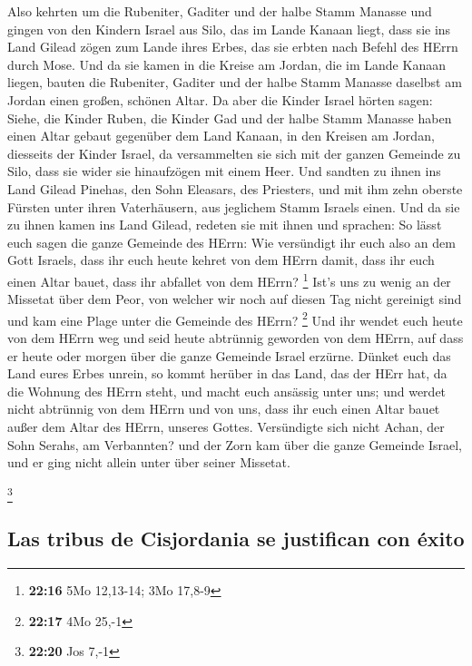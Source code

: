  Also kehrten um die Rubeniter, Gaditer und der halbe
Stamm Manasse und gingen von den Kindern Israel aus Silo, das im Lande
Kanaan liegt, dass sie ins Land Gilead zögen zum Lande ihres Erbes, das
sie erbten nach Befehl des HErrn durch Mose.  Und da sie
kamen in die Kreise am Jordan, die im Lande Kanaan liegen, bauten die
Rubeniter, Gaditer und der halbe Stamm Manasse daselbst am Jordan einen
großen, schönen Altar.  Da aber die Kinder Israel hörten
sagen: Siehe, die Kinder Ruben, die Kinder Gad und der halbe Stamm
Manasse haben einen Altar gebaut gegenüber dem Land Kanaan, in den
Kreisen am Jordan, diesseits der Kinder Israel,  da
versammelten sie sich mit der ganzen Gemeinde zu Silo, dass sie wider
sie hinaufzögen mit einem Heer.  Und sandten zu ihnen ins
Land Gilead Pinehas, den Sohn Eleasars, des Priesters, 
und mit ihm zehn oberste Fürsten unter ihren Vaterhäusern, aus jeglichem
Stamm Israels einen.  Und da sie zu ihnen kamen ins Land
Gilead, redeten sie mit ihnen und sprachen:  So lässt
euch sagen die ganze Gemeinde des HErrn: Wie versündigt ihr euch also an
dem Gott Israels, dass ihr euch heute kehret von dem HErrn damit, dass
ihr euch einen Altar bauet, dass ihr abfallet von dem HErrn? \footnote{\textbf{22:16}
  5Mo 12,13-14; 3Mo 17,8-9}  Ist's uns zu wenig an der
Missetat über dem Peor, von welcher wir noch auf diesen Tag nicht
gereinigt sind und kam eine Plage unter die Gemeinde des HErrn?
\footnote{\textbf{22:17} 4Mo 25,-1}  Und ihr wendet euch
heute von dem HErrn weg und seid heute abtrünnig geworden von dem HErrn,
auf dass er heute oder morgen über die ganze Gemeinde Israel erzürne.
 Dünket euch das Land eures Erbes unrein, so kommt
herüber in das Land, das der HErr hat, da die Wohnung des HErrn steht,
und macht euch ansässig unter uns; und werdet nicht abtrünnig von dem
HErrn und von uns, dass ihr euch einen Altar bauet außer dem Altar des
HErrn, unseres Gottes.  Versündigte sich nicht Achan, der
Sohn Serahs, am Verbannten? und der Zorn kam über die ganze Gemeinde
Israel, und er ging nicht allein unter über seiner Missetat.

\footnote{\textbf{22:20} Jos 7,-1}

\hypertarget{las-tribus-de-cisjordania-se-justifican-con-uxe9xito}{%
\subsection{Las tribus de Cisjordania se justifican con
éxito}\label{las-tribus-de-cisjordania-se-justifican-con-uxe9xito}}

